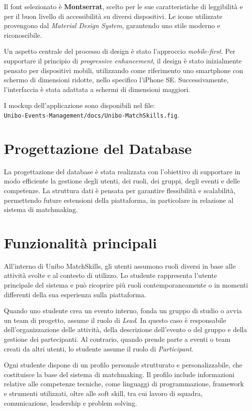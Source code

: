 \documentclass[a4paper,12pt]{article}
\begin{document}
Il font selezionato è \textbf{Montserrat}, scelto per le sue caratteristiche di leggibilità e per il buon livello di accessibilità su diversi dispositivi. Le icone utilizzate provengono dal \textit{Material Design System}, garantendo uno stile moderno e riconoscibile.

Un aspetto centrale del processo di design è stato l’approccio \textit{mobile-first}. Per supportare il principio di \textit{progressive enhancement}, il design è stato inizialmente pensato per dispositivi mobili, utilizzando come riferimento uno smartphone con schermo di dimensioni ridotte, nello specifico l’iPhone SE. Successivamente, l’interfaccia è stata adattata a schermi di dimensioni maggiori.

I mockup dell’applicazione sono disponibili nel file:\\
\texttt{Unibo-Events-Management/docs/Unibo-MatchSkills.fig}.

\section{Progettazione del Database}

La progettazione del database è stata realizzata con l’obiettivo di supportare in modo efficiente la gestione degli utenti, dei ruoli, dei gruppi, degli eventi e delle competenze. La struttura dati è pensata per garantire flessibilità e scalabilità, permettendo future estensioni della piattaforma, in particolare in relazione al sistema di matchmaking.

\section{Funzionalità principali}

All’interno di Unibo MatchSkills, gli utenti assumono ruoli diversi in base alle attività svolte e al contesto di utilizzo. Lo studente rappresenta l’utente principale del sistema e può ricoprire più ruoli contemporaneamente o in momenti differenti della sua esperienza sulla piattaforma.

Quando uno studente crea un evento interno, fonda un gruppo di studio o avvia un team di progetto, assume il ruolo di \textit{Lead}. In questo caso è responsabile dell’organizzazione delle attività, della descrizione dell’evento o del gruppo e della gestione dei partecipanti. Al contrario, quando prende parte a eventi o team creati da altri utenti, lo studente assume il ruolo di \textit{Participant}.

Ogni studente dispone di un profilo personale strutturato e personalizzabile, che costituisce la base del sistema di matchmaking. Il profilo include informazioni relative alle competenze tecniche, come linguaggi di programmazione, framework e strumenti utilizzati, oltre alle soft skill, tra cui lavoro di squadra, comunicazione, leadership e problem solving.
\end{document}
